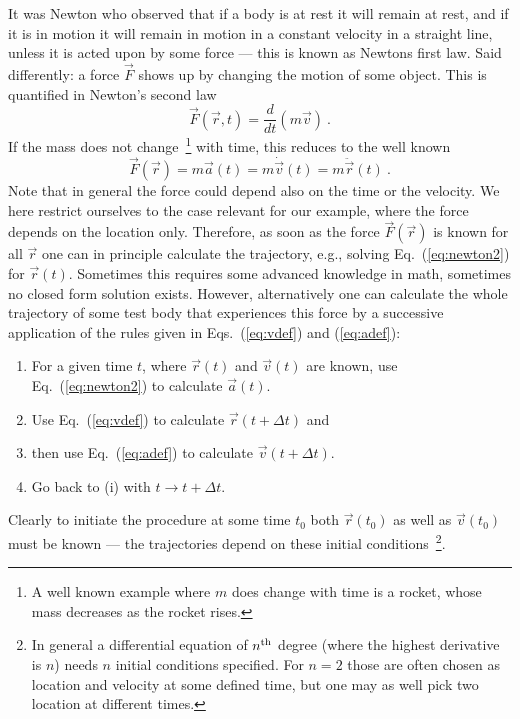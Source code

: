 \documentclass[12pt,ngerman,american]{iopart}
\begin{document}
It was Newton who observed that if a body is at rest it will remain at rest, and if it is in motion it will remain in motion in a constant velocity in a straight line, unless it is acted upon by some force --- this is known as Newtons first law.
Said differently: a force $\vec F$ shows up by changing the motion of some object.
This is quantified in Newton's second law
\begin{equation}
\vec F(\vec r, t) = \frac{d}{dt}(m \vec v) \ .
\end{equation}
If the mass does not change~\footnote{%
	A well known example where $m$ does change with time is a rocket, whose mass decreases as the rocket rises.
} with time, this reduces to the well known
\begin{equation}
\vec F(\vec r) = m \vec a(t) = m\dot{\vec v}(t) = m\ddot{\vec{r}}(t) \ . \label{eq:newton2}
\end{equation}
Note that in general the force could depend also on the time or the velocity.
We here restrict ourselves to the case relevant for our example, where the force depends on the location only.
Therefore, as soon as the force $\vec F(\vec r)$ is known for all $\vec r$ one can in principle calculate the trajectory, e.g., solving Eq.~(\ref{eq:newton2}) for $\vec r(t)$.
Sometimes this requires some advanced knowledge in math, sometimes no closed form solution exists.
However, alternatively one can calculate the whole trajectory of some test body that experiences this force by a successive application of the rules given in Eqs.~(\ref{eq:vdef}) and (\ref{eq:adef}):
\begin{enumerate}
\item For a given time $t$, where $\vec r(t)$ and $\vec v(t)$ are known, use Eq.~(\ref{eq:newton2}) to calculate $\vec a(t)$.
\item Use Eq.~(\ref{eq:vdef}) to calculate $\vec r(t+\Delta t)$ and
\item then use Eq.~(\ref{eq:adef}) to calculate $\vec v(t+\Delta t)$.
\item Go back to (i) with $t\to t+\Delta t$.
\end{enumerate}
Clearly to initiate the procedure at some time $t_0$ both $\vec r(t_0)$ as well as $\vec v(t_0)$ must be known --- the  trajectories depend on these initial conditions~\footnote{%
	In general a differential equation of $n^{\rm th}$ degree (where the highest derivative is $n$) needs $n$ initial conditions specified.
	For $n=2$ those are often chosen as location and velocity at some defined time, but one may as well pick two location at different times.%
}.
\end{document}
